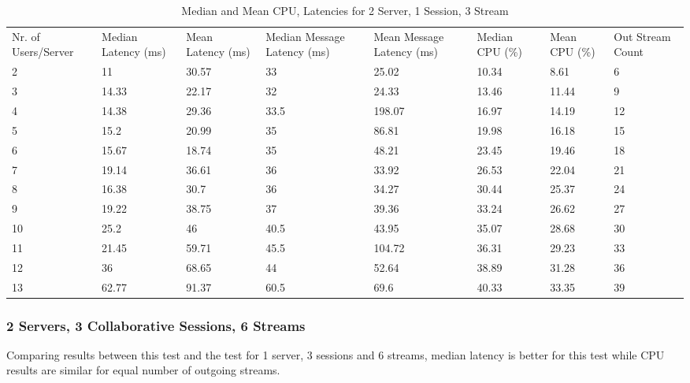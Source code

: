 \begin{table}
\caption{Median and Mean CPU, Latencies for 2 Server, 1 Session, 3 Stream}
\label{table:2serv_1sess_3str}
\begin{tabu} to\linewidth{|X[c]|X[c]|X[c]|X[c]|X[c]|X[c]|X[c]|X[c]|}
\everyrow{\hline}
\hline
Nr. of Users/Server & Median Latency (ms) & Mean Latency (ms) & Median Message Latency (ms) & Mean Message Latency (ms) & Median CPU (\%) & Mean CPU (\%) & Out Stream Count\\
2 & 11 & 30.57 & 33 & 25.02 & 10.34 & 8.61 & 6 \\
3 & 14.33 & 22.17 & 32 & 24.33 & 13.46 & 11.44 & 9 \\
4 & 14.38 & 29.36 & 33.5 & 198.07 & 16.97 & 14.19 & 12 \\
5 & 15.2 & 20.99 & 35 & 86.81 & 19.98 & 16.18 & 15 \\
6 & 15.67 & 18.74 & 35 & 48.21 & 23.45 & 19.46 & 18 \\
7 & 19.14 & 36.61 & 36 & 33.92 & 26.53 & 22.04 & 21 \\
8 & 16.38 & 30.7 & 36 & 34.27 & 30.44 & 25.37 & 24 \\
9 & 19.22 & 38.75 & 37 & 39.36 & 33.24 & 26.62 & 27 \\
10 & 25.2 & 46 & 40.5 & 43.95 & 35.07 & 28.68 & 30 \\
11 & 21.45 & 59.71 & 45.5 & 104.72 & 36.31 & 29.23 & 33 \\
12 & 36 & 68.65 & 44 & 52.64 & 38.89 & 31.28 & 36 \\
13 & 62.77 & 91.37 & 60.5 & 69.6 & 40.33 & 33.35 & 39 \\
\end{tabu}
\end{table}

\subsubsection{2 Servers, 3 Collaborative Sessions, 6 Streams}

Comparing results between this test and the test for 1 server, 3 sessions and 6 streams, median latency is better for this test while CPU results are similar for equal number of outgoing streams.
 
